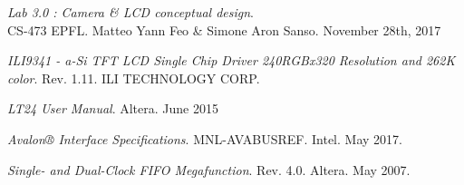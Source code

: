 \thispagestyle{empty}
\vspace{1cm}
\begin{thebibliography}{9}

\textit{Lab 3.0 : Camera \& LCD conceptual design}. \\
CS-473 EPFL. Matteo Yann Feo \& Simone Aron Sanso. November 28th, 2017

\textit{ILI9341 - a-Si TFT LCD Single Chip Driver 240RGBx320 Resolution and 262K color}. 
Rev. 1.11. ILI TECHNOLOGY CORP.

\textit{LT24 User Manual}. 
Altera. June 2015
 
\textit{Avalon® Interface Specifications}.
MNL-AVABUSREF. Intel. May 2017.
 
\textit{Single- and Dual-Clock FIFO Megafunction}.
Rev. 4.0. Altera. May 2007.

\end{thebibliography}